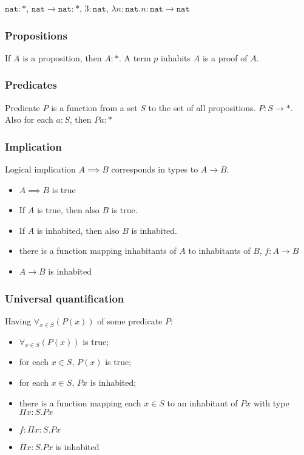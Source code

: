 \documentclass[12pt, a4paper]{article}
\begin{document}
$\mathtt{nat} : *$, $\mathtt{nat} \to \mathtt{nat} :*$, $3 : \mathtt{nat}$, $\lambda n : \mathtt{nat} . n : \mathtt{nat} \to \mathtt{nat}$

\subsubsection{Propositions}
If $A$ is a proposition, then $A : *$. A term $p$ inhabits $A$ is a proof of $A$. 

\subsubsection{Predicates}
Predicate $P$ is a function from a set $S$ to the set of all propositions. $P : S \to *$. 
Also for each $a : S$, then $Pa : *$

\subsubsection{Implication}
 Logical implication $A \implies B$ corresponds in types to $A \to B$.

 \begin{itemize}
     \item $A \implies B$ is true
     \item If $A$ is true, then also $B$ is true.
     \item If $A$ is inhabited, then also $B$ is inhabited.
     \item there is a function mapping inhabitants of $A$ to inhabitants of $B$, $f : A \to B$
     \item $A \to B$ is inhabited
 \end{itemize}

 \subsubsection{Universal quantification}
 Having $\forall_{x \in S}(P(x))$ of some predicate $P$:

 \begin{itemize}
     \item $\forall_{x \in S}(P(x))$ is true;
     \item for each $x \in S$, $P(x)$ is true;
     \item for each $x \in S$, $Px$ is inhabited;
     \item there is a function mapping each $x \in S$ to an inhabitant of $Px$ with type $\Pi x : S. Px$
     \item $f : \Pi x : S . Px$
     \item $\Pi x : S . Px$ is inhabited
 \end{itemize}
\end{document}
